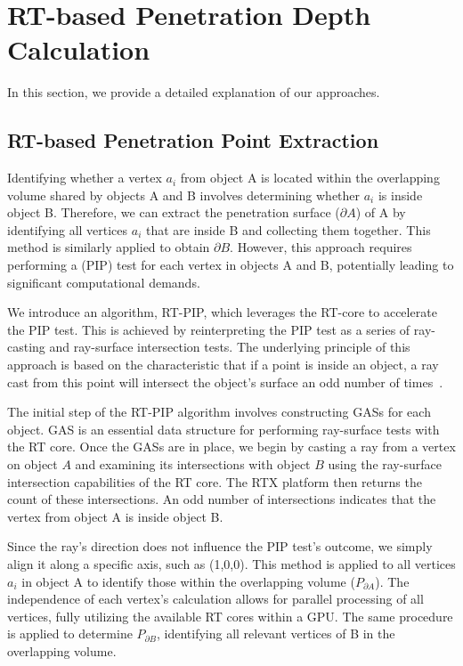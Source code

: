 \section{RT-based Penetration Depth Calculation}

In this section, we provide a detailed explanation of our approaches.

\subsection{RT-based Penetration Point Extraction}\label{sec:RT-PIP}

Identifying whether a vertex $a_i$ from object A is located within the overlapping volume shared by objects A and B involves determining whether $a_i$ is inside object B.
Therefore, we can extract the penetration surface ($\partial A$) of A by identifying all vertices $a_i$ that are inside B and collecting them together.
This method is similarly applied to obtain $\partial B$.
However, this approach requires performing a  (PIP) test for each vertex in objects A and B, potentially leading to significant computational demands.

We introduce an algorithm, RT-PIP, which leverages the RT-core to accelerate the PIP test.
This is achieved by reinterpreting the PIP test as a series of ray-casting and ray-surface intersection tests.
The underlying principle of this approach is based on the characteristic that if a point is inside an object, a ray cast from this point will intersect the object's surface an odd number of times~\cite{huang1997complexity}.

The initial step of the RT-PIP algorithm involves constructing GASs for each object.
GAS is an essential data structure for performing ray-surface tests with the RT core.
Once the GASs are in place, we begin by casting a ray from a vertex on object $A$ and examining its intersections with object $B$ using the ray-surface intersection capabilities of the RT core.
The RTX platform then returns the count of these intersections.
An odd number of intersections indicates that the vertex from object A is inside object B.

Since the ray’s direction does not influence the PIP test’s outcome, we simply align it along a specific axis, such as (1,0,0).
This method is applied to all vertices $a_i$ in object A to identify those within the overlapping volume ($P_{\partial A}$).
The independence of each vertex’s calculation allows for parallel processing of all vertices, fully utilizing the available RT cores within a GPU.
The same procedure is applied to determine $P_{\partial B}$, identifying all relevant vertices of B in the overlapping volume.

